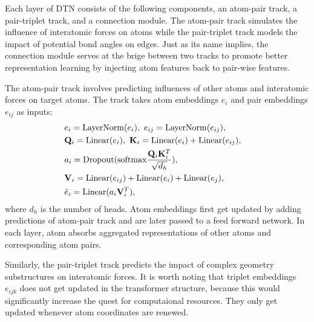 \documentclass[letterpaper]{article} %
\begin{document}
Each layer of DTN consists of the following components, an atom-pair track, a pair-triplet track, and a connection module. The atom-pair track simulates the influence of interatomic forces on atoms while the pair-triplet track models the impact of potential bond angles on edges. Just as its name implies, the connection module serves at the brige between two tracks to promote better representation learning by injecting atom features back to pair-wise features.

The atom-pair track involves predicting influences of other atoms and interatomic forces on target atoms. The track takes atom embeddings $e_i$ and pair embeddings $e_{ij}$ as inputs:
\begin{eqnarray}
    &e_i = {\rm LayerNorm}(e_i), \ e_{ij} = {\rm LayerNorm}(e_{ij}),& \\
    &\mathbf{Q}_i = {\rm Linear}(e_i), \ \mathbf{K}_i = {\rm Linear}(e_i) + {\rm Linear}(e_{ij}),& \\
    &a_i = {\rm Dropout}({\rm softmax} \frac{\mathbf{Q}_i \mathbf{K}_i^T}{\sqrt{d_h}}), & \\
    &\mathbf{V}_i = {\rm Linear}(e_{ij}) + {\rm Linear}(e_{i}) + {\rm Linear}(e_{j}),& \\
    &\hat{e}_i = {\rm Linear}(a_i \mathbf{V}_i^T),&
\end{eqnarray}
where $d_h$ is the number of heads. Atom embeddings first get updated by adding predictions of atom-pair track and are later passed to a feed forward network. In each layer, atom absorbs aggregated representations of other atoms and corresponding atom pairs.

Similarly, the pair-triplet track predicts the impact of complex geometry substructures on interatomic forces.
It is worth noting that triplet embeddings $e_{ijk}$ does not get updated in the transformer structure, because this would significantly increase the quest for computaional resources. They only get updated whenever atom coordinates are renewed.
\end{document}
